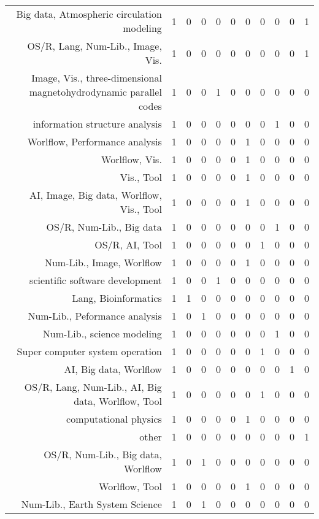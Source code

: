 {\begin{landscape}
\begin{longtable}[htb]{r|c|c|c|c|c|c|c|c|c|c}
{Big data, Atmospheric circulation modeling} & 1 & 0 & 0 & 0 & 0 & 0 & 0 & 0 & 0 & 1 \\%
{OS/R, Lang, Num-Lib., Image, Vis.} & 1 & 0 & 0 & 0 & 0 & 0 & 0 & 0 & 0 & 1 \\%
{Image, Vis., three-dimensional magnetohydrodynamic parallel codes} & 1 & 0 & 0 & 1 & 0 & 0 & 0 & 0 & 0 & 0 \\%
{information structure analysis} & 1 & 0 & 0 & 0 & 0 & 0 & 0 & 1 & 0 & 0 \\%
{Worlflow, Performance analysis} & 1 & 0 & 0 & 0 & 0 & 1 & 0 & 0 & 0 & 0 \\%
{Worlflow, Vis.} & 1 & 0 & 0 & 0 & 0 & 1 & 0 & 0 & 0 & 0 \\%
{Vis., Tool} & 1 & 0 & 0 & 0 & 0 & 1 & 0 & 0 & 0 & 0 \\%
{AI, Image, Big data, Worlflow, Vis., Tool} & 1 & 0 & 0 & 0 & 0 & 1 & 0 & 0 & 0 & 0 \\%
{OS/R, Num-Lib., Big data} & 1 & 0 & 0 & 0 & 0 & 0 & 0 & 1 & 0 & 0 \\%
{OS/R, AI, Tool} & 1 & 0 & 0 & 0 & 0 & 0 & 1 & 0 & 0 & 0 \\%
{Num-Lib., Image, Worlflow} & 1 & 0 & 0 & 0 & 0 & 1 & 0 & 0 & 0 & 0 \\%
{scientific software development} & 1 & 0 & 0 & 1 & 0 & 0 & 0 & 0 & 0 & 0 \\%
{Lang, Bioinformatics} & 1 & 1 & 0 & 0 & 0 & 0 & 0 & 0 & 0 & 0 \\%
{Num-Lib., Peformance analysis} & 1 & 0 & 1 & 0 & 0 & 0 & 0 & 0 & 0 & 0 \\%
{Num-Lib., science modeling} & 1 & 0 & 0 & 0 & 0 & 0 & 0 & 1 & 0 & 0 \\%
{Super computer system operation} & 1 & 0 & 0 & 0 & 0 & 0 & 1 & 0 & 0 & 0 \\%
{AI, Big data, Worlflow} & 1 & 0 & 0 & 0 & 0 & 0 & 0 & 0 & 1 & 0 \\%
{OS/R, Lang, Num-Lib., AI, Big data, Worlflow, Tool} & 1 & 0 & 0 & 0 & 0 & 0 & 1 & 0 & 0 & 0 \\%
{computational physics} & 1 & 0 & 0 & 0 & 0 & 1 & 0 & 0 & 0 & 0 \\%
{other} & 1 & 0 & 0 & 0 & 0 & 0 & 0 & 0 & 0 & 1 \\%
{OS/R, Num-Lib., Big data, Worlflow} & 1 & 0 & 1 & 0 & 0 & 0 & 0 & 0 & 0 & 0 \\%
{Worlflow, Tool} & 1 & 0 & 0 & 0 & 0 & 1 & 0 & 0 & 0 & 0 \\%
{Num-Lib., Earth System Science} & 1 & 0 & 1 & 0 & 0 & 0 & 0 & 0 & 0 & 0 \\%

\end{longtable}
\end{landscape}}
